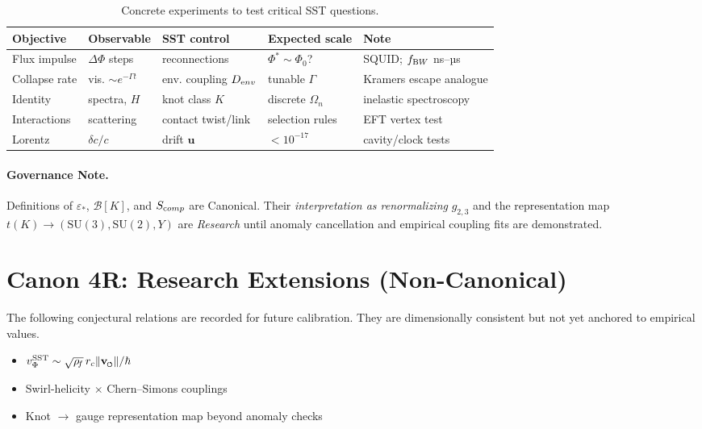 \documentclass[11pt]{article}
\begin{document}
\begin{table}[H]
\centering
\caption{Concrete experiments to test critical SST questions.}
\begin{tabular}{lllll}
\toprule
Objective & Observable & SST control & Expected scale & Note \\
\midrule
Flux impulse & $\Delta\Phi$ steps & reconnections & $\Phi^*\sim\Phi_0$? & SQUID; $f_{\textrm BW}$ ns--µs \\
Collapse rate & vis. $\sim e^{-\Gamma t}$ & env. coupling $D_{\textrm env}$ & tunable $\Gamma$ & Kramers escape analogue \\
Identity & spectra, $H$ & knot class $K$ & discrete $\Omega_n$ & inelastic spectroscopy \\
Interactions & scattering & contact twist/link & selection rules & EFT vertex test \\
Lorentz & $\delta c/c$ & drift $\mathbf u$ & $<10^{-17}$ & cavity/clock tests \\
\bottomrule
\end{tabular}
\end{table}

\paragraph{Governance Note.}
Definitions of $\varepsilon_*$, $\mathcal B[K]$, and $S_{\textrm comp}$ are Canonical.
Their \emph{interpretation as renormalizing} $g_{2,3}$ and the representation map
$t(K)\to(\mathrm{SU}(3),\mathrm{SU}(2),Y)$ are \emph{Research} until anomaly cancellation
and empirical coupling fits are demonstrated.

\section*{Canon 4R: Research Extensions (Non-Canonical)}
The following conjectural relations are recorded for future calibration. They are
dimensionally consistent but not yet anchored to empirical values.
\begin{itemize}
	\item $v_\Phi^{\rm SST} \sim \sqrt{\rho_{\!f}}\, r_c \lVert \vswirl \rVert / \hbar$
	\item Swirl-helicity $\times$ Chern–Simons couplings
	\item Knot $\to$ gauge representation map beyond anomaly checks
\end{itemize}

\end{document}
